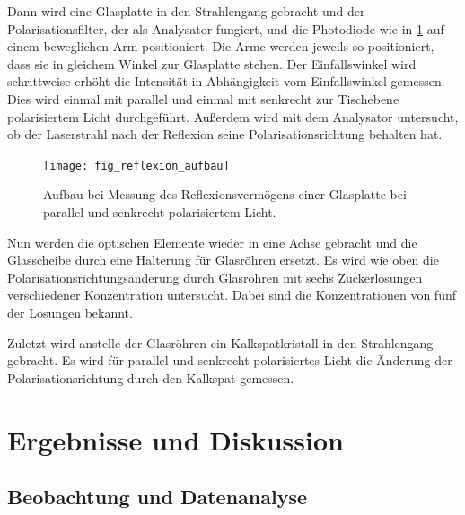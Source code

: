 \documentclass[
	a4paper,
	12pt,
	pagesize,
	ngerman
]{scrartcl}
\begin{document}
	Dann wird eine Glasplatte in den Strahlengang gebracht und der Polarisationsfilter, der als Analysator fungiert, und die Photodiode wie in \cref{fig_reflexion_aufbau} auf einem beweglichen Arm positioniert.
	Die Arme werden jeweils so positioniert, dass sie in gleichem Winkel zur Glasplatte stehen.
	Der Einfallswinkel wird schrittweise erhöht die Intensität in Abhängigkeit vom Einfallswinkel gemessen.
	Dies wird einmal mit parallel und einmal mit senkrecht zur Tischebene polarisiertem Licht durchgeführt.
	Außerdem wird mit dem Analysator untersucht, ob der Laserstrahl nach der Reflexion seine Polarisationsrichtung behalten hat.
	
	\begin{figure}[H] 
		\texttt{[image: fig\_reflexion\_aufbau]}
		\centering
		\caption{Aufbau bei Messung des Reflexionsvermögens einer Glasplatte bei parallel und senkrecht polarisiertem Licht.\cite{aufbau_reflexion}} 
		\label{fig_reflexion_aufbau}
		\centering
	\end{figure}
	
	Nun werden die optischen Elemente wieder in eine Achse gebracht und die Glasscheibe durch eine Halterung für Glasröhren ersetzt.
	Es wird wie oben die Polarisationsrichtungsänderung durch Glasröhren mit sechs Zuckerlösungen verschiedener Konzentration untersucht.
	Dabei sind die Konzentrationen von fünf der Lösungen bekannt.
	
	Zuletzt wird anstelle der Glasröhren ein Kalkspatkristall in den Strahlengang gebracht.
	Es wird für parallel und senkrecht polarisiertes Licht die Änderung der Polarisationsrichtung durch den Kalkspat gemessen.
	
	\section{Ergebnisse und Diskussion}
	

	\subsection{Beobachtung und Datenanalyse}
\end{document}
